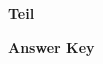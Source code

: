 \documentclass[../Exercise.tex]{subfiles}
\begin{document}
\begin{center}
	\large{\textbf{Teil }}
\end{center} 

\vspace{7ex}
\begin{framed}
\textbf{Answer Key}
\end{framed}
\vspace{7ex}
\end{document}
